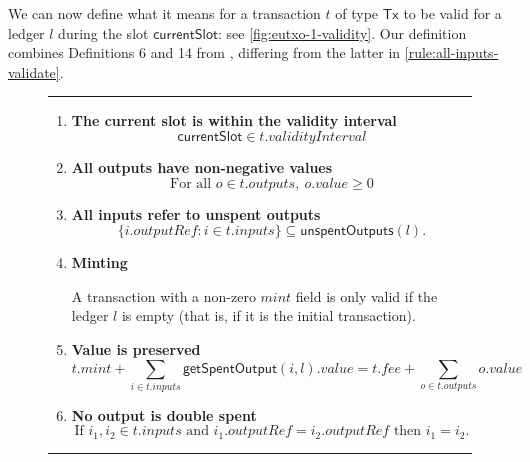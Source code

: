 \documentclass[a4paper]{article}
\renewcommand{\i}{\textit}  %
\newcommand{\msf}[1]{\ensuremath{\mathsf{#1}}}
\newcommand{\mi}[1]{\ensuremath{\mathit{#1}}}
\newcommand\rfskip{7pt}
\newenvironment{ruledfigure}[1]{\begin{figure}[#1]\hrule\vspace{\rfskip}}{\vspace{\rfskip}\hrule\end{figure}}
\newcommand{\inputs}{\mi{inputs}}
\newcommand{\outputs}{\mi{outputs}}
\newcommand{\mint}{\mi{mint}}
\newcommand{\fee}{\mi{fee}}
\newcommand{\val}{\mi{value}}  %
\newcommand{\outputref}{\mi{outputRef}}
\newcommand{\getSpent}{\msf{getSpentOutput}}
\newcommand{\unspent}{\msf{unspentOutputs}}
\newcommand{\eutxotx}{\msf{Tx}}
\begin{document}
We can now define what it means for a transaction $t$ of type
$\eutxotx$ to be valid for a ledger $l$ during the slot
$\msf{currentSlot}$: see \cref{fig:eutxo-1-validity}.  Our definition
combines Definitions 6 and 14 from \citep{Zahnentferner18-UTxO},
differing from the latter in \cref{rule:all-inputs-validate}.

\begin{ruledfigure}{H}
\begin{enumerate}

\item
  \label{rule:slot-in-range}
  \textbf{The current slot is within the validity interval}
  \begin{displaymath}
    \msf{currentSlot} \in t.\i{validityInterval}
  \end{displaymath}

\item
  \label{rule:all-outputs-are-non-negative}
  \textbf{All outputs have non-negative values}
  \begin{displaymath}
    \textrm{For all } o \in t.\outputs,\ o.\val \geq 0
  \end{displaymath}

\item
  \label{rule:all-inputs-refer-to-unspent-outputs}
  \textbf{All inputs refer to unspent outputs}
  \begin{displaymath}
    \{i.\outputref: i \in t.\inputs \} \subseteq \unspent(l).
  \end{displaymath}

\item
  \label{rule:minting}
  \textbf{Minting}

  A transaction with a non-zero \mint{}
  field is only valid if the ledger $l$ is empty (that
  is, if it is the initial transaction).

\item
  \label{rule:value-is-preserved}
  \textbf{Value is preserved}
  \begin{displaymath}
    t.\mint + \sum_{i \in t.\inputs} \getSpent(i, l).\val = t.\fee + \sum_{o \in t.\outputs} o.\val
  \end{displaymath}

\item
  \label{rule:no-double-spending}
  \textbf{No output is double spent}
  \begin{displaymath}
    \textrm{If } i_1, i_2 \in t.\inputs \textrm{ and }  i_1.\outputref = i_2.\outputref
    \textrm{ then } i_1 = i_2.
  \end{displaymath}


\end{enumerate}
\end{ruledfigure}
\end{document}
